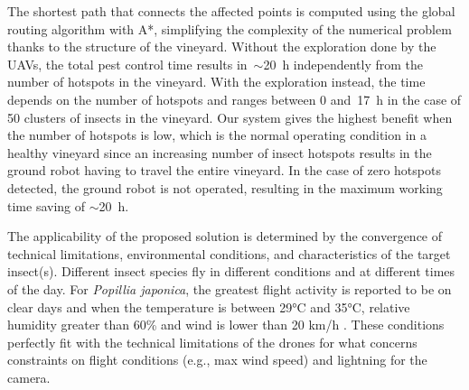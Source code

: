 The shortest path that connects the affected points is computed using the global routing algorithm with A*, simplifying the complexity of the numerical problem thanks to the structure of the vineyard.
Without the exploration done by the UAVs, the total pest control time results in~$\sim$\SI{20}{\hour} independently from the number of hotspots in the vineyard.
With the exploration instead, the time depends on the number of hotspots and ranges between 0 and~\SI{17}{\hour} in the case of 50 clusters of insects in the vineyard.
Our system gives the highest benefit when the number of hotspots is low, which is the normal operating condition in a healthy vineyard since an increasing number of insect hotspots results in the ground robot having to travel the entire vineyard.
In the case of zero hotspots detected, the ground robot is not operated, resulting in the maximum working time saving of $\sim$\SI{20}{\hour}.

The applicability of the proposed solution is determined by the convergence of technical limitations, environmental conditions, and characteristics of the target insect(s). Different insect species fly in different conditions and at different times of the day. For \textit{Popillia japonica}, the greatest flight activity is reported to be on clear days and when the temperature is between 29°C and 35°C, relative humidity greater than 60\% and wind is lower than 20 km/h \cite{eppo-popillia}. These conditions perfectly fit with the technical limitations of the drones for what concerns constraints on flight conditions (e.g., max wind speed) and lightning for the camera. 